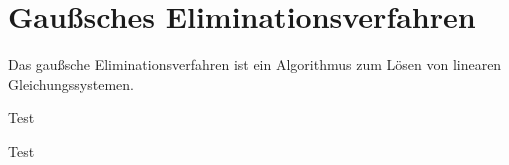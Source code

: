 \section{Gaußsches Eliminationsverfahren}
Das gaußsche Eliminationsverfahren ist ein Algorithmus zum Lösen von linearen Gleichungssystemen.

\begin{procedure}
  Test
\end{procedure}


\begin{example}
  Test
\end{example}

